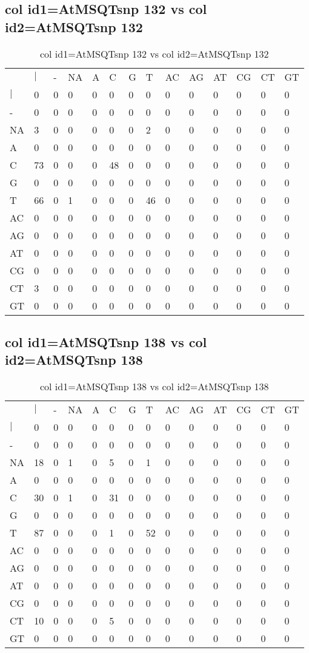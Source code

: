 \subsection{col id1=AtMSQTsnp 132 vs col id2=AtMSQTsnp 132}
\begin{center}
\begin{longtable}{|l|l|l|l|l|l|l|l|l|l|l|l|l|l|}
\caption{col id1=AtMSQTsnp 132 vs col id2=AtMSQTsnp 132} \label{table_dm514}\\
\hline
\\
\hline
&$|$&-&NA&A&C&G&T&AC&AG&AT&CG&CT&GT\\
$|$&0&0&0&0&0&0&0&0&0&0&0&0&0\\
-&0&0&0&0&0&0&0&0&0&0&0&0&0\\
NA&3&0&0&0&0&0&2&0&0&0&0&0&0\\
A&0&0&0&0&0&0&0&0&0&0&0&0&0\\
C&73&0&0&0&48&0&0&0&0&0&0&0&0\\
G&0&0&0&0&0&0&0&0&0&0&0&0&0\\
T&66&0&1&0&0&0&46&0&0&0&0&0&0\\
AC&0&0&0&0&0&0&0&0&0&0&0&0&0\\
AG&0&0&0&0&0&0&0&0&0&0&0&0&0\\
AT&0&0&0&0&0&0&0&0&0&0&0&0&0\\
CG&0&0&0&0&0&0&0&0&0&0&0&0&0\\
CT&3&0&0&0&0&0&0&0&0&0&0&0&0\\
GT&0&0&0&0&0&0&0&0&0&0&0&0&0\\
\hline
\end{longtable}
\end{center}

\subsection{col id1=AtMSQTsnp 138 vs col id2=AtMSQTsnp 138}
\begin{center}
\begin{longtable}{|l|l|l|l|l|l|l|l|l|l|l|l|l|l|}
\caption{col id1=AtMSQTsnp 138 vs col id2=AtMSQTsnp 138} \label{table_dm516}\\
\hline
\\
\hline
&$|$&-&NA&A&C&G&T&AC&AG&AT&CG&CT&GT\\
$|$&0&0&0&0&0&0&0&0&0&0&0&0&0\\
-&0&0&0&0&0&0&0&0&0&0&0&0&0\\
NA&18&0&1&0&5&0&1&0&0&0&0&0&0\\
A&0&0&0&0&0&0&0&0&0&0&0&0&0\\
C&30&0&1&0&31&0&0&0&0&0&0&0&0\\
G&0&0&0&0&0&0&0&0&0&0&0&0&0\\
T&87&0&0&0&1&0&52&0&0&0&0&0&0\\
AC&0&0&0&0&0&0&0&0&0&0&0&0&0\\
AG&0&0&0&0&0&0&0&0&0&0&0&0&0\\
AT&0&0&0&0&0&0&0&0&0&0&0&0&0\\
CG&0&0&0&0&0&0&0&0&0&0&0&0&0\\
CT&10&0&0&0&5&0&0&0&0&0&0&0&0\\
GT&0&0&0&0&0&0&0&0&0&0&0&0&0\\
\hline
\end{longtable}
\end{center}

